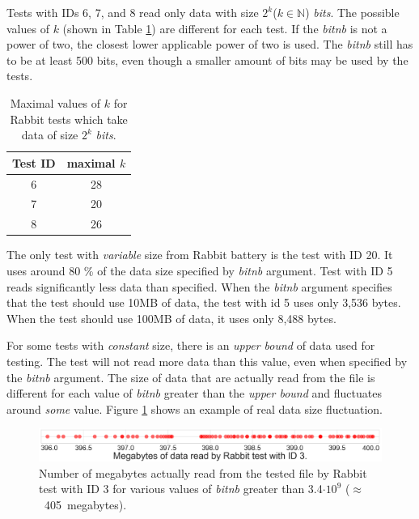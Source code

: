 \documentclass[
  digital,     %
  oneside,     %
  nosansbold,  %
  nocolorbold, %
  nolof,         %
  nolot,         %
]{fithesis4}
\begin{document}
Tests with IDs 6, 7, and 8 read only data with size $2^k$($k \in \mathbb{N}$) \emph{bits}. The possible values of $k$ \cite{tu01_guide} (shown in Table \ref{tab:analysis_rabbit_two_powers}) are different for each test. If the \emph{bit\textunderscore nb} is not a power of two, the closest lower applicable power of two is used. The \emph{bit\textunderscore nb} still has to be at least 500 bits, even though a smaller amount of bits may be used by the tests.

\begin{table}[h]
  \begin{tabularx}{0.33\textwidth}{c|c}
    Test ID & maximal $k$\\
    \midrule
    6& 28\\
    7& 20\\
    8& 26\\
 
  \end{tabularx}
  \caption{Maximal values of $k$ for Rabbit tests which take data of size $2^k$ \emph{bits}.}
  \label{tab:analysis_rabbit_two_powers}
\end{table}

The only test with \emph{variable} size from Rabbit battery is the test with ID 20. It uses around 80 \% of the data size specified by \emph{bit\textunderscore nb} argument. Test with ID 5 reads significantly less data than specified. When the \emph{bit\textunderscore nb} argument specifies that the test should use 10MB of data, the test with id 5 uses only  3,536 bytes. When the test should use 100MB of data, it uses only 8,488 bytes.

For some tests with \emph{constant} size, there is an \emph{upper bound} of data used for testing. The test will not read more data than this value, even when specified by the \emph{bit\textunderscore nb} argument. The size of data that are actually read from the file is different for each value of \emph{bit\textunderscore nb} greater than the \emph{upper bound} and fluctuates around \emph{some} value. Figure \ref{fig:analysis-rabbit-max} shows an example of real data size fluctuation.

\begin{figure}[h]
  \begin{center}
    \includegraphics[width=12.7cm]{figures/rabbit_3_maxims.png}
  \end{center}
  \caption{Number of megabytes actually read from the tested file by Rabbit test with ID 3 for various values of \emph{bit\textunderscore nb} greater than 3.4$\cdot10^{9}$ ($\approx$~405~megabytes).}
  \label{fig:analysis-rabbit-max}
\end{figure}
\end{document}
